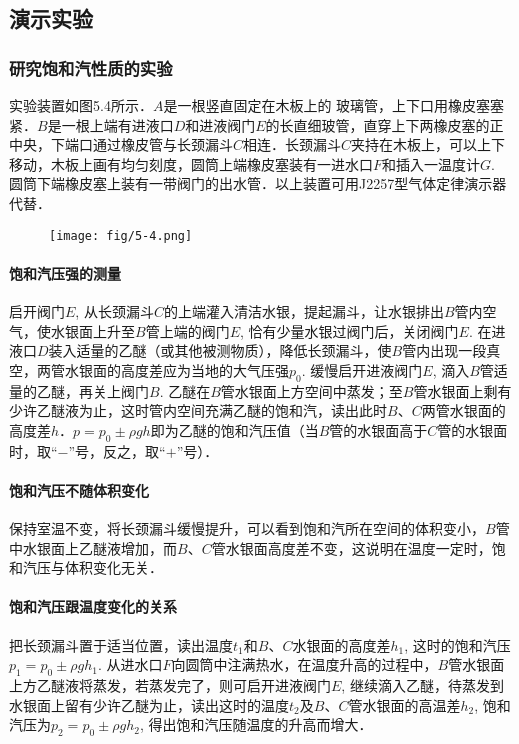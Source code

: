 \subsection{演示实验}
\subsubsection{研究饱和汽性质的实验}

实验装置如图5.4所示．$A$是一根竖直固定在木板上的
玻璃管，上下口用橡皮塞塞紧．$B$是一根上端有进液口$D$和进液阀门$E$的长直细玻管，直穿上下两橡皮塞的正中央，下端口通过橡皮管与长颈漏斗$C$相连．长颈漏斗$C$夹持在木板上，可以上下移动，木板上画有均匀刻度，圆筒上端橡皮塞装有一进水口$F$和插入一温度计$G$. 圆筒下端橡皮塞上装有一带阀门的出水管．以上装置可用J2257型气体定律演示器代替．
\begin{figure}[htp]
    \centering
      \texttt{[image: fig/5-4.png]}
    \caption{}
\end{figure}

\paragraph{饱和汽压强的测量}
启开阀门$E$, 从长颈漏斗$C$的上端灌入清洁水银，提起漏斗，让水银排出$B$管内空气，使水银面上升至$B$管上端的阀门$E$, 恰有少量水银过阀门后，关闭阀门$E$. 在进液口$D$装入适量的乙醚（或其他被测物质），降低长颈漏斗，使$B$管内出现一段真空，两管水银面的高度差应为当地的大气压强$p_0$. 缓慢启开进液阀门$E$, 滴入$B$管适量的乙醚，再关上阀门$B$. 乙醚在$B$管水银面上方空间中蒸发；至$B$管水银面上剩有少许乙醚液为止，这时管内空间充满乙醚的饱和汽，读出此时$B$、$C$两管水银面的高度差$h$．$p=p_0\pm \rho gh$即为乙醚的饱和汽压值（当$B$管的水银面高于$C$管的水银面时，取“$-$”号，反之，取“$+$”号）．

\paragraph{饱和汽压不随体积变化}
保持室温不变，将长颈漏斗缓慢提升，可以看到饱和汽所在空间的体积变小，$B$管中水银面上乙醚液增加，而$B$、$C$管水银面高度差不变，这说明在温度一定时，饱和汽压与体积变化无关．

\paragraph{饱和汽压跟温度变化的关系}
把长颈漏斗置于适当位置，读出温度$t_1$和$B$、$C$水银面的高度差$h_1$, 这时的饱和汽压$p_1=p_0\pm\rho gh_1$. 从进水口$F$向圆筒中注满热水，在温度升高的过程中，$B$管水银面上方乙醚液将蒸发，若蒸发完了，则可启开进液阀门$E$, 继续滴入乙醚，待蒸发到水银面上留有少许乙醚为止，读出这时的温度$t_2$及$B$、$C$管水银面的高温差$h_2$, 饱和汽压为$p_2=p_0\pm \rho gh_2$, 得出饱和汽压随温度的升高而增大．

